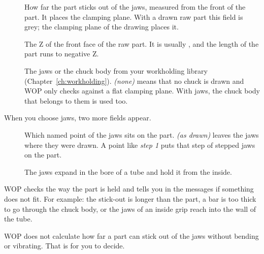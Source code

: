 \begin{description}
\item[] How far the part sticks out of the jaws, measured from the front of the part. It places the clamping plane. With a drawn raw part this field is grey; the clamping plane of the drawing places it.
\item[] The Z of the front face of the raw part. It is usually , and the length of the part runs to negative Z.
\item[] The jaws or the chuck body from your workholding library (Chapter~\ref{ch:workholding}). \emph{(none)} means that no chuck is drawn and WOP only checks against a flat clamping plane. With jaws, the chuck body that belongs to them is used too.
\end{description}

When you choose jaws, two more fields appear.

\begin{description}
\item[] Which named point of the jaws sits on the part. \emph{(as drawn)} leaves the jaws where they were drawn. A point like \emph{step 1} puts that step of stepped jaws on the part.
\item[] The jaws expand in the bore of a tube and hold it from the inside.
\end{description}

WOP checks the way the part is held and tells you in the messages if something does not fit. For example: the stick-out is longer than the part, a bar is too thick to go through the chuck body, or the jaws of an inside grip reach into the wall of the tube.

\begin{notebox}
WOP does not calculate how far a part can stick out of the jaws without bending or vibrating. That is for you to decide.
\end{notebox}
